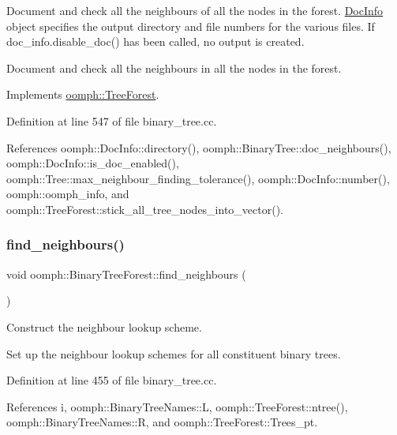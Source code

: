 Document and check all the neighbours of all the nodes in the forest. \hyperlink{classoomph_1_1DocInfo}{Doc\+Info} object specifies the output directory and file numbers for the various files. If {\ttfamily doc\+\_\+info.\+disable\+\_\+doc()} has been called, no output is created. 

Document and check all the neighbours in all the nodes in the forest. 

Implements \hyperlink{classoomph_1_1TreeForest_a0e6a7f821d9f14374c6d23d8766c7679}{oomph\+::\+Tree\+Forest}.



Definition at line 547 of file binary\+\_\+tree.\+cc.



References oomph\+::\+Doc\+Info\+::directory(), oomph\+::\+Binary\+Tree\+::doc\+\_\+neighbours(), oomph\+::\+Doc\+Info\+::is\+\_\+doc\+\_\+enabled(), oomph\+::\+Tree\+::max\+\_\+neighbour\+\_\+finding\+\_\+tolerance(), oomph\+::\+Doc\+Info\+::number(), oomph\+::oomph\+\_\+info, and oomph\+::\+Tree\+Forest\+::stick\+\_\+all\+\_\+tree\+\_\+nodes\+\_\+into\+\_\+vector().

\mbox{\label{classoomph_1_1BinaryTreeForest_a01845fafe6ef29f11226bf11e07eec1a}} 
\subsubsection{\texorpdfstring{find\+\_\+neighbours()}{find\_neighbours()}}
{\footnotesize\ttfamily void oomph\+::\+Binary\+Tree\+Forest\+::find\+\_\+neighbours (\begin{DoxyParamCaption}{ }\end{DoxyParamCaption})\hspace{0.3cm}{\ttfamily [private]}}



Construct the neighbour lookup scheme. 

Set up the neighbour lookup schemes for all constituent binary trees. 

Definition at line 455 of file binary\+\_\+tree.\+cc.



References i, oomph\+::\+Binary\+Tree\+Names\+::L, oomph\+::\+Tree\+Forest\+::ntree(), oomph\+::\+Binary\+Tree\+Names\+::R, and oomph\+::\+Tree\+Forest\+::\+Trees\+\_\+pt.



